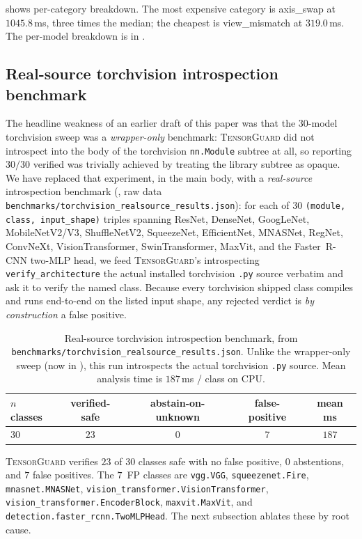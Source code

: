 \documentclass{article}
\theoremstyle{definition}
\begin{document}
 shows per-category breakdown. The most
expensive category is \textsf{axis\_swap} at $1045.8$\,ms, three times
the median; the cheapest is \textsf{view\_mismatch} at $319.0$\,ms.
The per-model breakdown is in .

\subsection{Real-source torchvision introspection benchmark}
\label{sec:tv-source}

The headline weakness of an earlier draft of this paper was that the
$30$-model torchvision sweep was a \emph{wrapper-only} benchmark:
\textsc{TensorGuard} did not introspect into the body of the
torchvision \verb|nn.Module| subtree at all, so reporting
$30/30$ \textsf{verified} was trivially achieved by treating the
library subtree as opaque. We have replaced that experiment, in the
main body, with a \emph{real-source} introspection benchmark
(, raw data
\verb|benchmarks/torchvision_realsource_results.json|): for each of
$30$ \texttt{(module, class, input\_shape)} triples spanning
ResNet, DenseNet, GoogLeNet, MobileNetV2/V3, ShuffleNetV2,
SqueezeNet, EfficientNet, MNASNet, RegNet, ConvNeXt,
VisionTransformer, SwinTransformer, MaxVit, and the Faster~R-CNN
two-MLP head, we feed \textsc{TensorGuard}'s
introspecting \verb|verify_architecture| the actual installed
torchvision \verb|.py| source verbatim and ask it to verify the
named class. Because every torchvision shipped class compiles and
runs end-to-end on the listed input shape, any \textsf{rejected}
verdict is \emph{by construction} a false positive.

\begin{table}[t]
\centering\small
\caption{Real-source torchvision introspection benchmark, from
\texttt{benchmarks/torchvision\_realsource\_results.json}. Unlike
the wrapper-only sweep (now in ), this run
introspects the actual torchvision \texttt{.py} source. Mean
analysis time is $187$\,ms / class on CPU.}
\label{tab:tv-source}
\begin{tabular}{lcccc}
\toprule
$n$ classes & verified-safe & abstain-on-unknown & false-positive & mean ms \\
\midrule
$30$ & $23$ & $0$ & $7$ & $187$ \\
\bottomrule
\end{tabular}
\end{table}

\textsc{TensorGuard} verifies $23$ of $30$ classes safe with no
false positive, $0$ abstentions, and $7$ false positives. The
$7$~FP classes are \texttt{vgg.VGG}, \texttt{squeezenet.Fire},
\texttt{mnasnet.MNASNet},
\texttt{vision\_transformer.VisionTransformer},
\texttt{vision\_transformer.EncoderBlock}, \texttt{maxvit.MaxVit},
and \texttt{detection.faster\_rcnn.TwoMLPHead}. The next subsection
ablates these by root cause.
\end{document}

